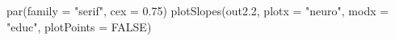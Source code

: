 \begin{Schunk}
\begin{Sinput}
 par(family = "serif", cex = 0.75)
 plotSlopes(out2.2,
            plotx = "neuro",
            modx = "educ",
            plotPoints = FALSE)
\end{Sinput}
\end{Schunk}
